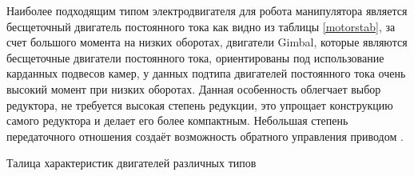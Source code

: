 Наиболее подходящим типом электродвигателя для робота манипулятора является бесщеточный двигатель постоянного тока как видно из таблицы \ref{motorstab}, за счет большого момента на низких оборотах, двигатели Gimbal, которые являются бесщеточные двигатели постоянного тока, ориентированы под использование карданных подвесов камер, у данных подтипа двигателей постоянного тока очень высокий момент при низких оборотах. Данная особенность облегчает выбор редуктора, не требуется высокая степень редукции, это упрощает конструкцию самого редуктора и делает его более компактным. Небольшая степень передаточного отношения создаёт возможность обратного управления приводом \citep{8867893}.

\begin{table}[H]
	\centering
	\caption{Талица характеристик двигателей различных типов}\label{motorstab}
	\begin{adjustbox}{width={\textwidth}}


\end{adjustbox}
\end{table}
